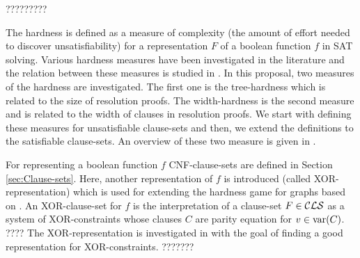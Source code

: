 \documentclass{report}
\begin{document}
?????????

The hardness is defined as a measure of complexity (the amount of effort needed to discover unsatisfiability) for a representation $F$ of a boolean function $f$ in SAT solving. Various hardness measures have been investigated in the literature and the relation between these measures is studied in \cite{BeyersdorffGwynneKullmann2013PHPER,BeyersdorffKullmann2014PHP,GwynneKullmann2013GoodRepresentationsIIex}. In this proposal, two measures of the hardness are investigated. The first one is the tree-hardness which is related to the size of resolution proofs. The width-hardness is the second measure and is related to the width of clauses in resolution proofs. We start with defining these measures for unsatisfiable clause-sets and then, we extend the definitions to the satisfiable clause-sets. An overview of these two measure is given in \cite{BeyersdorffGwynneKullmann2013PHPER,BeyersdorffKullmann2014PHP,?? }.

For representing a boolean function $f$ CNF-clause-sets are defined in Section \ref{sec:Clause-sets}. Here, another representation of $f$ is introduced (called XOR-representation) which is used for extending the hardness game for graphs based on \cite{GwynneKullmann2013GoodRepresentationsIIex,GwynneKullmann2013GoodRepresentationsIILata}. An XOR-clause-set for $f$ is the interpretation of a clause-set $F \in \mathcal{CLS}$ as a system of XOR-constraints whose clauses $C$ are parity equation for $v \in \operatorname{var}(C)$. 
????
The XOR-representation is investigated in \cite{GwynneKullmann2013GoodRepresentations,GwynneKullmann2013GoodRepresentationsIIex,GwynneKullmann2013GoodRepresentationsIILata} with the goal of finding a good representation for XOR-constraints.
???????
\end{document}
